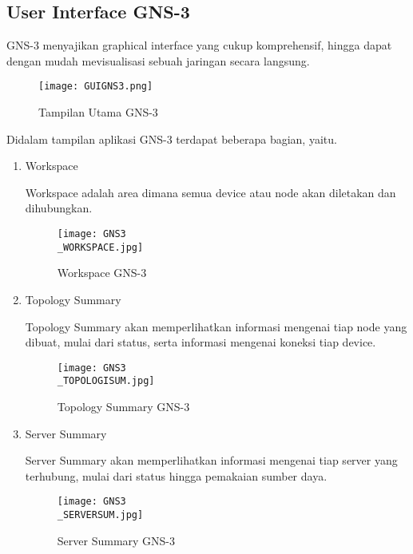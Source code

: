 \documentclass[12pt, a4paper]{article}
\begin{document}
    \subsection{User Interface GNS-3}

      GNS-3 menyajikan graphical interface yang cukup komprehensif, hingga
      dapat dengan mudah mevisualisasi sebuah jaringan secara langsung.

      \begin{figure}[h]
          \centering
          \texttt{[image: GUIGNS3.png]}
          \caption{\small{Tampilan Utama GNS-3}}
      \end{figure}

      Didalam tampilan aplikasi GNS-3 terdapat beberapa bagian, yaitu.

      \begin{enumerate}[label=\arabic*.]

        \item Workspace

          Workspace adalah area dimana semua device atau node akan diletakan
          dan dihubungkan.

          \begin{figure}[h]
              \centering
              \texttt{[image: GNS3\\\_WORKSPACE.jpg]}
              \caption{\small{Workspace GNS-3}}
          \end{figure}

        \item Topology Summary

          Topology Summary akan memperlihatkan informasi mengenai tiap node
          yang dibuat, mulai dari status, serta informasi mengenai koneksi
          tiap device.

          \begin{figure}[h]
              \centering
              \texttt{[image: GNS3\\\_TOPOLOGISUM.jpg]}
              \caption{\small{Topology Summary GNS-3}}
          \end{figure}

        \item Server Summary

          Server Summary akan memperlihatkan informasi mengenai tiap server
          yang terhubung, mulai dari status hingga pemakaian sumber daya.

          \begin{figure}[h]
              \centering
              \texttt{[image: GNS3\\\_SERVERSUM.jpg]}
              \caption{\small{Server Summary GNS-3}}
          \end{figure}


\end{enumerate}
\end{document}
